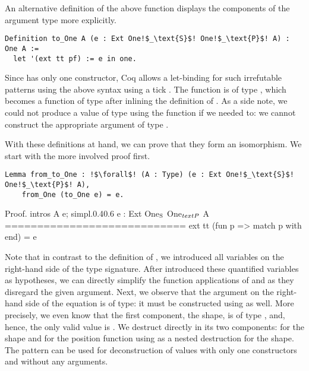 An alternative definition of the above function displays the components of the argument type  more explicitly.

\begin{verbatim}
Definition to_One A (e : Ext One!$_\text{S}$! One!$_\text{P}$! A) : One A :=
  let '(ext tt pf) := e in one.
\end{verbatim}

Since  has only one constructor, Coq allows a let-binding for such irrefutable patterns using the above syntax using a tick .
The function  is of type , which becomes a function of type  after inlining the definition of .
As a side note, we could not produce a value of type  using the function  if we needed to: we cannot construct the appropriate argument of type .

With these definitions at hand, we can prove that they form an isomorphism.
We start with the more involved proof  first.

\begin{verbatim}
Lemma from_to_One : !$\forall$! (A : Type) (e : Ext One!$_\text{S}$! One!$_\text{P}$! A),
    from_One (to_One e) = e.
\end{verbatim}

\begin{cproof1}{Proof. intros A e; simpl.}{0.4}{0.6}
  e : Ext One\(\sb{\text{S}}\) One\(\sb{text{P}}\) A
  ============================
  ext tt (fun p => match p with end) = e
\end{cproof1}

Note that in contrast to the definition of , we introduced all variables on the right-hand side of the type signature.
After introduced these quantified variables as hypotheses, we can directly simplify the function applications of  and  as they disregard the given argument.
Next, we observe that the argument  on the right-hand side of the equation is of type: it must be constructed using  as well.
More precisely, we even know that the first component, the shape, is of type , and, hence, the only valid value is .
We destruct  directly in its two components:  for the shape and  for the position function using \cinl{[]} as a nested destruction for the shape.
The pattern \cinl{[]} can be used for deconstruction of values with only one constructors and without any arguments.

